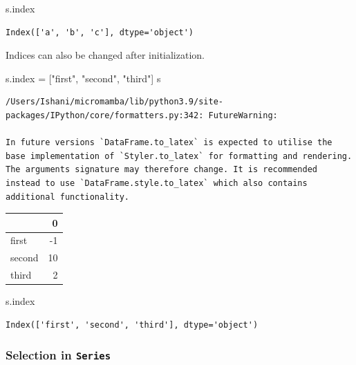 \documentclass[
  letterpaper,
  DIV=11,
  numbers=noendperiod]{scrreprt}
\newenvironment{Shaded}{\begin{snugshade}}{\end{snugshade}}
\newcommand{\NormalTok}[1]{\textcolor[rgb]{0.00,0.23,0.31}{#1}}
\newcommand{\OperatorTok}[1]{\textcolor[rgb]{0.37,0.37,0.37}{#1}}
\newcommand{\StringTok}[1]{\textcolor[rgb]{0.13,0.47,0.30}{#1}}
\begin{document}
\begin{Shaded}
\begin{Highlighting}[]
\NormalTok{s.index}
\end{Highlighting}
\end{Shaded}

\begin{verbatim}
Index(['a', 'b', 'c'], dtype='object')
\end{verbatim}

Indices can also be changed after initialization.

\begin{Shaded}
\begin{Highlighting}[]
\NormalTok{s.index }\OperatorTok{=}\NormalTok{ [}\StringTok{"first"}\NormalTok{, }\StringTok{"second"}\NormalTok{, }\StringTok{"third"}\NormalTok{]}
\NormalTok{s}
\end{Highlighting}
\end{Shaded}

\begin{verbatim}
/Users/Ishani/micromamba/lib/python3.9/site-packages/IPython/core/formatters.py:342: FutureWarning:

In future versions `DataFrame.to_latex` is expected to utilise the base implementation of `Styler.to_latex` for formatting and rendering. The arguments signature may therefore change. It is recommended instead to use `DataFrame.style.to_latex` which also contains additional functionality.
\end{verbatim}

\begin{tabular}{lr}
\toprule
{} &   0 \\
\midrule
first  &  -1 \\
second &  10 \\
third  &   2 \\
\bottomrule
\end{tabular}

\begin{Shaded}
\begin{Highlighting}[]
\NormalTok{s.index}
\end{Highlighting}
\end{Shaded}

\begin{verbatim}
Index(['first', 'second', 'third'], dtype='object')
\end{verbatim}

\hypertarget{selection-in-series}{%
\subsubsection{\texorpdfstring{Selection in
\texttt{Series}}{Selection in Series}}\label{selection-in-series}}
\end{document}
